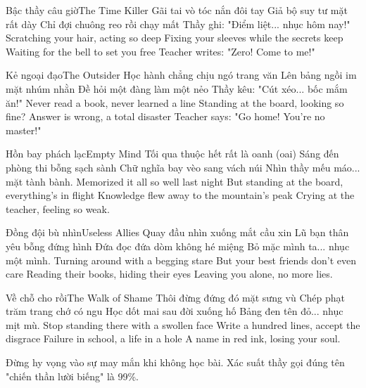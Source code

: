\begin{tutuyetbox}{Bậc thầy câu giờ}{The Time Killer}
Gãi tai vò tóc nắn đôi tay
Giả bộ suy tư mặt rất dày
Chỉ đợi chuông reo rồi chạy mất
Thầy ghi: "Điểm liệt... nhục hôm nay!"
\tcblower
Scratching your hair, acting so deep
Fixing your sleeves while the secrets keep
Waiting for the bell to set you free
Teacher writes: "Zero! Come to me!"
\end{tutuyetbox}

\begin{tutuyetbox}{Kẻ ngoại đạo}{The Outsider}
Học hành chẳng chịu ngó trang văn
Lên bảng ngồi im mặt nhúm nhằn
Đề hỏi một đàng làm một nẻo
Thầy kêu: "Cút xéo... bốc mắm ăn!"
\tcblower
Never read a book, never learned a line
Standing at the board, looking so fine?
Answer is wrong, a total disaster
Teacher says: "Go home! You're no master!"
\end{tutuyetbox}

\begin{tutuyetbox}{Hồn bay phách lạc}{Empty Mind}
Tối qua thuộc hết rất là oanh (oai)
Sáng đến phòng thi bỗng sạch sành
Chữ nghĩa bay vèo sang vách núi
Nhìn thầy mếu máo... mặt tành bành.
\tcblower
Memorized it all so well last night
But standing at the board, everything's in flight
Knowledge flew away to the mountain's peak
Crying at the teacher, feeling so weak.
\end{tutuyetbox}

\begin{tutuyetbox}{Đồng đội bù nhìn}{Useless Allies}
Quay đầu nhìn xuống mắt cầu xin
Lũ bạn thân yêu bỗng đứng hình
Đứa đọc đứa dòm không hé miệng
Bỏ mặc mình ta... nhục một mình.
\tcblower
Turning around with a begging stare
But your best friends don't even care
Reading their books, hiding their eyes
Leaving you alone, no more lies.
\end{tutuyetbox}

\begin{tutuyetbox}{Về chỗ cho rồi}{The Walk of Shame}
Thôi đừng đứng đó mặt sưng vù
Chép phạt trăm trang chớ có ngu
Học dốt mai sau đời xuống hố
Bảng đen tên đỏ... nhục mịt mù.
\tcblower
Stop standing there with a swollen face
Write a hundred lines, accept the disgrace
Failure in school, a life in a hole
A name in red ink, losing your soul.
\end{tutuyetbox}

\begin{ghichu}
Đừng hy vọng vào sự may mắn khi không học bài. Xác suất thầy gọi đúng tên "chiến thần lười biếng" là 99\%.
\end{ghichu}